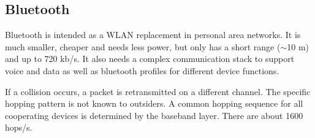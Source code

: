 \subsection{Bluetooth}
\begin{mytitle}[Bluetooth] Bluetooth is intended as a WLAN replacement in personal area networks. It is much smaller, cheaper and needs less power, but only has a short range ($\sim$10 m) and up to 720 kb/s. It also needs a complex communication stack to support voice and data as well as bluetooth profiles for different device functions. 
\end{mytitle}

\newpage
\begin{mytitle} If a collision occurs, a packet is retransmitted on a different channel. The specific hopping pattern is not known to outsiders. A common hopping sequence for all cooperating devices is determined by the baseband layer. There are about 1600 hops/s.
\end{mytitle}
